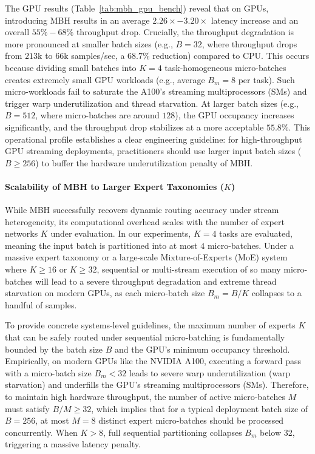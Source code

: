 The GPU results (Table~\ref{tab:mbh_gpu_bench}) reveal that on GPUs, introducing MBH results in an average \textbf{$2.26\times - 3.20\times$} latency increase and an overall \textbf{$55\% - 68\%$} throughput drop. Crucially, the throughput degradation is more pronounced at smaller batch sizes (e.g., $B=32$, where throughput drops from $213$k to $66$k samples/sec, a $68.7\%$ reduction) compared to CPU. This occurs because dividing small batches into $K=4$ task-homogeneous micro-batches creates extremely small GPU workloads (e.g., average $B_m = 8$ per task). Such micro-workloads fail to saturate the A100's streaming multiprocessors (SMs) and trigger warp underutilization and thread starvation. At larger batch sizes (e.g., $B=512$, where micro-batches are around $128$), the GPU occupancy increases significantly, and the throughput drop stabilizes at a more acceptable $55.8\%$. This operational profile establishes a clear engineering guideline: for high-throughput GPU streaming deployments, practitioners should use larger input batch sizes ($B \ge 256$) to buffer the hardware underutilization penalty of MBH.

\paragraph{Scalability of MBH to Larger Expert Taxonomies ($K$)}
While MBH successfully recovers dynamic routing accuracy under stream heterogeneity, its computational overhead scales with the number of expert networks $K$ under evaluation. In our experiments, $K=4$ tasks are evaluated, meaning the input batch is partitioned into at most $4$ micro-batches. Under a massive expert taxonomy or a large-scale Mixture-of-Experts (MoE) system where $K \ge 16$ or $K \ge 32$, sequential or multi-stream execution of so many micro-batches will lead to a severe throughput degradation and extreme thread starvation on modern GPUs, as each micro-batch size $B_m = B/K$ collapses to a handful of samples. 

To provide concrete systems-level guidelines, the maximum number of experts $K$ that can be safely routed under sequential micro-batching is fundamentally bounded by the batch size $B$ and the GPU's minimum occupancy threshold. Empirically, on modern GPUs like the NVIDIA A100, executing a forward pass with a micro-batch size $B_m < 32$ leads to severe warp underutilization (warp starvation) and underfills the GPU's streaming multiprocessors (SMs). Therefore, to maintain high hardware throughput, the number of active micro-batches $M$ must satisfy $B / M \ge 32$, which implies that for a typical deployment batch size of $B=256$, at most $M = 8$ distinct expert micro-batches should be processed concurrently. When $K > 8$, full sequential partitioning collapses $B_m$ below 32, triggering a massive latency penalty.


